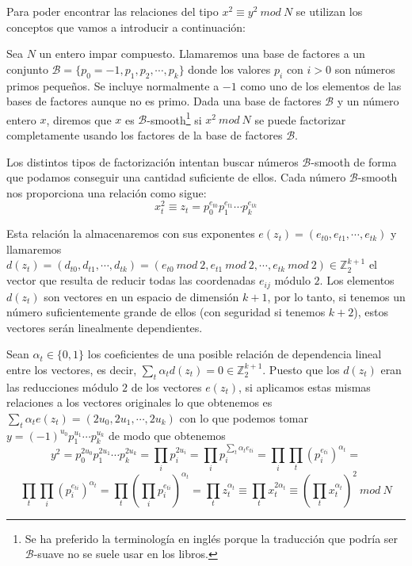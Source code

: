 Para poder encontrar las relaciones del tipo $x^2 \equiv y^2 ~mod~N$ se utilizan
los conceptos que vamos a introducir a continuaci\'on:

\begin{definition}
Sea $N$ un entero impar compuesto. Llamaremos una base de factores a un conjunto
${\mathcal B} = \{ p_0 = -1, p_1, p_2, \cdots, p_k \}$ donde los valores $p_i$ con $i>0$ son
n\'umeros primos peque\~nos. Se incluye normalmente a $-1$ como uno de los
elementos de las bases de factores aunque no es primo.
Dada una base de factores ${\mathcal B}$ y un n\'umero entero $x$, diremos
que $x$ es ${\mathcal B}$-smooth\footnote{Se ha preferido la terminolog\'ia en
ingl\'es porque la traducci\'on que podr\'ia ser ${\mathcal B}$-suave no se
suele usar en los libros.} si $x^2~mod~N$ se puede factorizar
completamente usando los factores de la base de factores ${\mathcal B}$.
\end{definition}

Los distintos tipos de factorizaci\'on intentan buscar n\'umeros ${\mathcal B}$-smooth
de forma que podamos conseguir una cantidad suficiente de ellos. Cada n\'umero ${\mathcal B}$-smooth nos
proporciona una relaci\'on como sigue:
\[ x_t^2 \equiv z_t = p_0^{e_{t0}} p_1^{e_{t1}} \cdots p_k^{e_{tk}} \]

Esta relaci\'on la almacenaremos con sus exponentes $e(z_t) = (e_{t0},e_{t1},\cdots,e_{tk})$ y llamaremos
$d(z_t) = (d_{t0},d_{t1},\cdots,d_{tk}) = (e_{t0}~mod~2,e_{t1}~mod~2,\cdots,e_{tk}~mod~2) \in
{\mathbb Z}_2^{k+1}$ el vector que resulta de reducir todas las coordenadas $e_{ij}$ m\'odulo $2$.
Los elementos $d(z_t)$ son vectores en un espacio de dimensi\'on $k+1$, por lo tanto,
si tenemos un n\'umero suficientemente grande de ellos (con seguridad si tenemos $k+2$), estos
vectores ser\'an linealmente dependientes.

Sean $\alpha_t \in \{0,1\}$ los coeficientes de una posible relaci\'on de dependencia lineal entre los
vectores, es decir, $\sum_{t} \alpha_t d(z_t) = 0 \in {\mathbb Z}_2^{k+1}$. Puesto que los $d(z_t)$ eran las reducciones m\'odulo $2$ de los vectores $e(z_t)$, si
aplicamos estas mismas relaciones a los vectores originales lo que obtenemos es $\sum_t \alpha_t e(z_t) = (2u_0, 2u_1, \cdots, 2u_k)$ con lo que podemos
tomar $y= (-1)^{u_0} p_1 ^ {u_1} \cdots p_k^{u_k}$ de modo que obtenemos
\[
y^2 =  p_0^{2u_0} p_1 ^ {2u_1} \cdots p_k^{2u_k} = \prod_{i} p_i^{2u_i} = \prod_i p_i^{\sum_t \alpha_t e_{ti}} =
\prod_i \prod_t \left(p_i^{e_{ti}}\right)^{\alpha_t} = \] \[\prod_t \prod_i \left(p_i^{e_{ti}}\right)^{\alpha_t} = \prod_t \left(\prod_i p_i^{e_{ti}}\right)^{\alpha_t} = \prod_t z_t^{\alpha_t} \equiv
\prod_t x_t^{2\alpha_t} \equiv \left( \prod_t x_t^{\alpha_t}\right)^2~mod~N
\]

